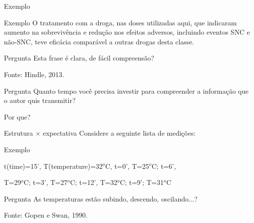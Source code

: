 \documentclass{beamer}
\begin{document}
\begin{frame}{Exemplo}
  \begin{exampleblock}{Exemplo}
    \footnotesize
    O tratamento com a droga, nas doses utilizadas aqui, que
    indicaram aumento na sobrevivência e redução nos efeitos adversos,
    incluindo eventos SNC e não-SNC, teve eficácia
    comparável a outras drogas desta classe.
  \end{exampleblock}

  \begin{block}{Pergunta}
    \scriptsize
    Esta frase é clara, de fácil compreensão?
  \end{block}

  \vfill
  \scriptsize
  \hfill Fonte: Hindle, 2013.
\end{frame}

\begin{frame}
  \begin{block}{Pergunta}
    \footnotesize
    Quanto tempo você precisa investir para compreender a informação que o autor quis transmitir?

    \bigskip

    Por que?
  \end{block}
\end{frame}

\begin{frame}{Estrutura $\times$ expectativa}
  Considere a seguinte lista de medições:
  \begin{exampleblock}{Exemplo}
    \scriptsize
    \begin{center}
    t(time)=15', T(temperature)=32$^o$C, t=0', T=25$^o$C; t=6',

    T=29$^o$C; t=3', T=27$^o$C; t=12', T=32$^o$C; t=9'; T=31$^o$C
  \end{center}
  \end{exampleblock}\pause

  \begin{block}{Pergunta}
    As temperaturas estão subindo, descendo, oscilando...?
  \end{block}
  \vfill
  \scriptsize
  \hfill Fonte: Gopen e Swan, 1990.
\end{frame}
\end{document}
